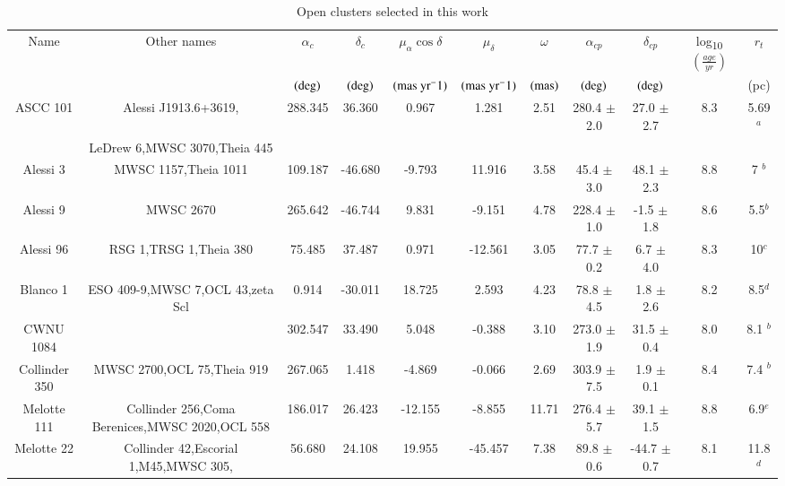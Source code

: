\documentclass{aa}
\begin{document}
\begin{appendix}
\begin{table}[h]
\end{table}




\begin{landscape}
\begin{table}
\centering
\caption{Open clusters selected in this work }
\label{Table: Clusters_basics_params} 
\begin{tabular}{c c c c c c c c c c c}  
\hline\hline           
Name & Other names & $\alpha_c $ & $\delta_c$ & $\mu_{\alpha} \cos{\delta}$ & $\mu_{\delta}$& $\omega$&  $\alpha_{cp} $   & $\delta_{cp} $ & log\textsubscript{10}$(\frac{age}{yr})$ & $r_t$  \\ 
     &              & $(\rm{deg})$ & $(\rm{deg})$ & $(\rm{mas \ yr^-1})$ & $(\rm{mas \ yr^-1})$ & $(\rm{mas})$ &
$(\rm{deg})$ & $(\rm{deg})$ & &  (pc) \\   
\hline     
    ASCC 101 & Alessi J1913.6+3619, & 288.345   & 36.360  & 0.967     & 1.281     & 2.51 & 280.4 $\pm$ 2.0 & 27.0 $\pm$ 2.7  & 8.3 & 5.69$^a$ \\
            & LeDrew 6,MWSC 3070,Theia 445 & \\
\hline            
    Alessi 3 & MWSC 1157,Theia 1011 & 109.187   & -46.680 & -9.793    & 11.916    & 3.58 & 45.4 $\pm$ 3.0 & 48.1 $\pm$ 2.3 &  8.8 & 7 $^b$\\
\hline
    Alessi 9 & MWSC 2670 & 265.642   & -46.744 & 9.831    & -9.151   &  4.78 & 228.4 $\pm$ 1.0 & -1.5 $\pm$ 1.8  & 8.6 & 5.5$^b$\\
\hline
    Alessi 96 & RSG 1,TRSG 1,Theia 380  & 75.485    & 37.487  & 0.971   & -12.561    & 3.05 & 77.7 $\pm$ 0.2   &  6.7 $\pm$ 4.0  &  8.3 & 10$^c$\\
\hline
    Blanco 1 & ESO 409-9,MWSC 7,OCL 43,zeta Scl  & 0.914     & -30.011 & 18.725     & 2.593    & 4.23 & 78.8 $\pm$ 4.5 & 1.8 $\pm$ 2.6 & 8.2 & 8.5$^d$\\
\hline
    CWNU 1084 & & 302.547   & 33.490  & 5.048    & -0.388   &  3.10 & 273.0 $\pm$ 1.9  & 31.5 $\pm$ 0.4 & 8.0& 8.1 $^b$ \\
\hline
    Collinder 350 &MWSC 2700,OCL 75,Theia 919 & 267.065   & 1.418   & -4.869    & -0.066    & 2.69 & 303.9 $\pm$ 7.5 & 1.9 $\pm$ 0.1  & 8.4 &  7.4 $^b$\\
\hline
    Melotte 111 & Collinder 256,Coma Berenices,MWSC 2020,OCL 558 & 186.017   & 26.423  & -12.155    & -8.855   & 11.71 & 276.4 $\pm$ 5.7 & 39.1 $\pm$ 1.5 & 8.8 & 6.9$^e$\\ 
\hline
    Melotte 22 & Collinder 42,Escorial 1,M45,MWSC 305, & 56.680   & 24.108  & 19.955 & -45.457    & 7.38 & 89.8 $\pm$ 0.6 & -44.7 $\pm$ 0.7 & 8.1 & 11.8$^d$\\

\end{tabular}
\end{table}
\end{landscape}
\end{appendix}
\end{document}
